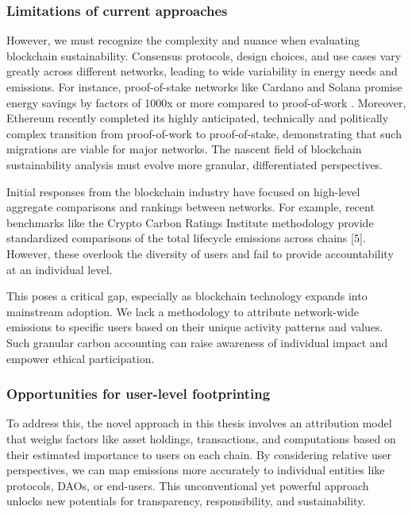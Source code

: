 \documentclass[11pt]{report}
\begin{document}
\subsubsection*{Limitations of current approaches}
However, we must recognize the complexity and nuance when evaluating blockchain sustainability. Consensus protocols, design choices, and use cases vary greatly across different networks, leading to wide variability in energy needs and emissions. For instance, proof-of-stake networks like Cardano and Solana promise energy savings by factors of 1000x or more compared to proof-of-work \cite{kohliAnalysisEnergyConsumption2023}. Moreover, Ethereum recently completed its highly anticipated, technically and politically complex transition from proof-of-work to proof-of-stake, demonstrating that such migrations are viable for major networks. \cite{EthereumMergeYour2022} The nascent field of blockchain sustainability analysis must evolve more granular, differentiated perspectives.

Initial responses from the blockchain industry have focused on high-level aggregate comparisons and rankings between networks. For example, recent benchmarks like the Crypto Carbon Ratings Institute methodology provide standardized comparisons of the total lifecycle emissions across chains [5]. However, these overlook the diversity of users and fail to provide accountability at an individual level.

This poses a critical gap, especially as blockchain technology expands into mainstream adoption. We lack a methodology to attribute network-wide emissions to specific users based on their unique activity patterns and values. Such granular carbon accounting can raise awareness of individual impact and empower ethical participation.

\subsubsection*{Opportunities for user-level footprinting}

To address this, the novel approach in this thesis involves an attribution model that weighs factors like asset holdings, transactions, and computations based on their estimated importance to users on each chain. By considering relative user perspectives, we can map emissions more accurately to individual entities like protocols, DAOs, or end-users. This unconventional yet powerful approach unlocks new potentials for transparency, responsibility, and sustainability.
\end{document}
